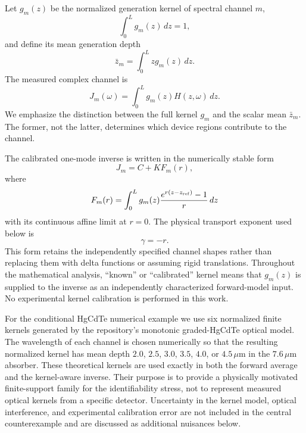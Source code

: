 \documentclass[aps,pra,twocolumn,superscriptaddress,nofootinbib]{revtex4-2}
\begin{document}
Let $g_m(z)$ be the normalized generation kernel of spectral channel $m$,
\begin{equation}
\int_0^L g_m(z)\,dz=1,
\end{equation}
and define its mean generation depth
\begin{equation}
\bar z_m=\int_0^L z g_m(z)\,dz.
\end{equation}
The measured complex channel is
\begin{equation}
\boxed{
J_m(\omega)=\int_0^L g_m(z)H(z,\omega)\,dz.
}
\label{eq:channel}
\end{equation}
We emphasize the distinction between the full kernel $g_m$ and the scalar mean $\bar z_m$. The former, not the latter, determines which device regions contribute to the channel.

The calibrated one-mode inverse is written in the numerically stable form
\begin{equation}
J_m=C+K F_m(r),
\label{eq:onemode}
\end{equation}
where
\begin{equation}
F_m(r)=\int_0^L g_m(z)
\frac{e^{r(z-z_{\rm ref})}-1}{r}\,dz
\end{equation}
with its continuous affine limit at $r=0$. The physical transport exponent used below is
\begin{equation}
\gamma=-r.
\end{equation}
This form retains the independently specified channel shapes rather than replacing them with delta functions or assuming rigid translations.  Throughout the mathematical analysis, ``known'' or ``calibrated'' kernel means that $g_m(z)$ is supplied to the inverse as an independently characterized forward-model input.  No experimental kernel calibration is performed in this work.

For the conditional HgCdTe numerical example we use six normalized finite kernels generated by the repository's monotonic graded-HgCdTe optical model.  The wavelength of each channel is chosen numerically so that the resulting normalized kernel has mean depth $2.0$, $2.5$, $3.0$, $3.5$, $4.0$, or $4.5\,\mu\mathrm{m}$ in the $7.6\,\mu\mathrm{m}$ absorber.  These theoretical kernels are used exactly in both the forward average and the kernel-aware inverse.  Their purpose is to provide a physically motivated finite-support family for the identifiability stress, not to represent measured optical kernels from a specific detector.  Uncertainty in the kernel model, optical interference, and experimental calibration error are not included in the central counterexample and are discussed as additional nuisances below.
\end{document}
